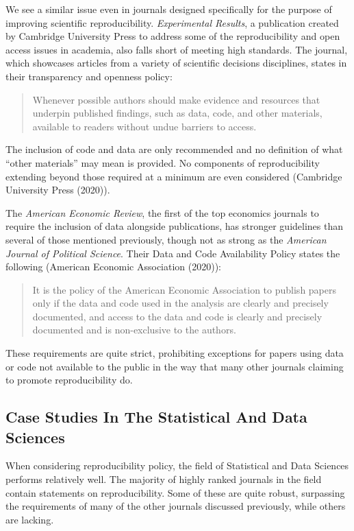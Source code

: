 \documentclass[12pt,twoside]{reedthesis}
\begin{document}
We see a similar issue even in journals designed specifically for the purpose of improving scientific reproducibility. \emph{Experimental Results}, a publication created by Cambridge University Press to address some of the reproducibility and open access issues in academia, also falls short of meeting high standards. The journal, which showcases articles from a variety of scientific decisions disciplines, states in their transparency and openness policy:
\begin{quote}
Whenever possible authors should make evidence and resources that underpin published findings, such as data, code, and other materials, available to readers without undue barriers to access.
\end{quote}
The inclusion of code and data are only recommended and no definition of what ``other materials'' may mean is provided. No components of reproducibility extending beyond those required at a minimum are even considered (Cambridge University Press (2020)).

The \emph{American Economic Review}, the first of the top economics journals to require the inclusion of data alongside publications, has stronger guidelines than several of those mentioned previously, though not as strong as the \emph{American Journal of Political Science}. Their Data and Code Availability Policy states the following (American Economic Association (2020)):
\begin{quote}
It is the policy of the American Economic Association to publish papers only if the data and code used in the analysis are clearly and precisely documented, and access to the data and code is clearly and precisely documented and is non-exclusive to the authors.
\end{quote}
These requirements are quite strict, prohibiting exceptions for papers using data or code not available to the public in the way that many other journals claiming to promote reproducibility do.

\hypertarget{case-studies-in-the-statistical-and-data-sciences}{%
\subsection{Case Studies In The Statistical And Data Sciences}\label{case-studies-in-the-statistical-and-data-sciences}}

When considering reproducibility policy, the field of Statistical and Data Sciences performs relatively well. The majority of highly ranked journals in the field contain statements on reproducibility. Some of these are quite robust, surpassing the requirements of many of the other journals discussed previously, while others are lacking.
\end{document}
